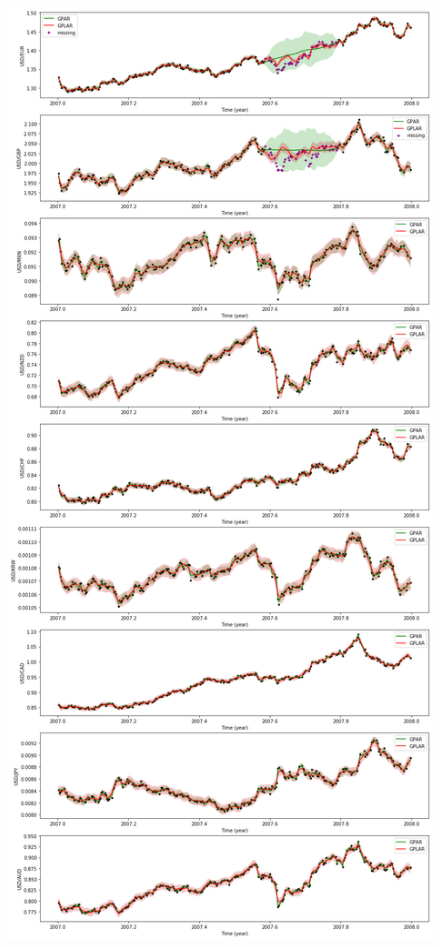 \documentclass{article}
\begin{document}
\begin{figure}[H]
\centering
\includegraphics[width=.6\linewidth]{exchange-bidirectional-2.png}
\end{figure}
\end{document}
